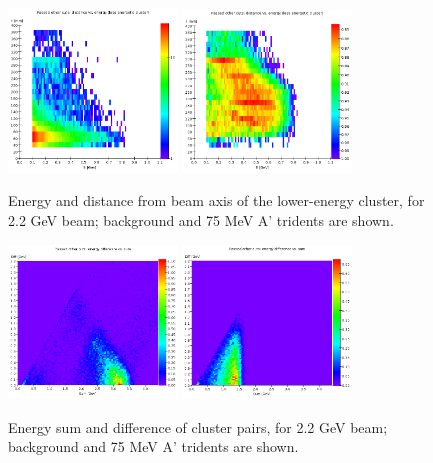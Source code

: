 \begin{figure}[ht]
	\includegraphics[width=0.4\textwidth]{performance/trigger/energy-distance_22}
	\includegraphics[width=0.4\textwidth]{performance/trigger/energy-distance_22_075mev}
	\caption{\small{Energy and distance from beam axis of the lower-energy cluster, for 2.2 GeV beam; background and 75 MeV A' tridents are shown.}}
	\label{fig:energy-distance}
\end{figure}

\begin{figure}[ht]
	\includegraphics[width=0.4\textwidth]{performance/trigger/ediff_22}
	\includegraphics[width=0.4\textwidth]{performance/trigger/ediff_22_075mev}
	\caption{\small{Energy sum and difference of cluster pairs, for 2.2 GeV beam; background and 75 MeV A' tridents are shown.}}
	\label{fig:ediff}
\end{figure}

